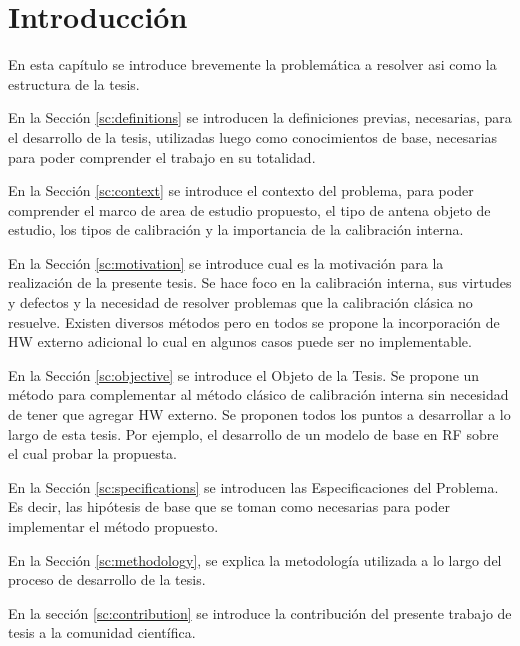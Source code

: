 
\chapter{Introducción} %

\label{ch:introduccion} %

En esta capítulo se introduce brevemente la problemática a resolver asi como la estructura de la tesis.

En la Sección \ref{sc:definitions} se introducen la definiciones previas, necesarias, para el desarrollo de la tesis, utilizadas
luego como conocimientos de base, necesarias para poder comprender el trabajo en su totalidad.

En la Sección \ref{sc:context} se introduce el contexto del problema, para poder comprender el marco de area de estudio
propuesto, el tipo de antena objeto de estudio, los tipos de calibración y la importancia de la calibración interna.

En la Sección \ref{sc:motivation} se introduce cual es la motivación para la realización de la presente tesis. Se hace foco
en la calibración interna, sus virtudes y defectos y la necesidad de resolver problemas que la calibración clásica no resuelve.
Existen diversos métodos pero en todos se propone la incorporación de HW externo adicional lo cual en algunos casos puede ser
no implementable.

En la Sección \ref{sc:objective} se introduce el Objeto de la Tesis. Se propone un método para complementar al método clásico
de calibración interna sin necesidad de tener que agregar HW externo. Se proponen todos los puntos a desarrollar a lo largo de
esta tesis. Por ejemplo, el desarrollo de un modelo de base en RF sobre el cual probar la propuesta.

En la Sección \ref{sc:specifications} se introducen las Especificaciones del Problema. Es decir, las hipótesis de base que se
toman como necesarias para poder implementar el método propuesto.

En la Sección \ref{sc:methodology}, se explica la metodología utilizada a lo largo del proceso de desarrollo de la tesis.

En la sección \ref{sc:contribution} se introduce la contribución del presente trabajo de tesis a la comunidad científica.

